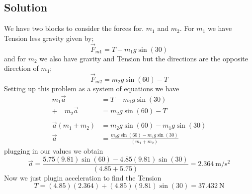 \documentclass{article}
\begin{document}
\subsection*{Solution}
We have two blocks to consider the forces for. $m_1$ and $m_2$. For $m_1$ we have Tension less gravity given by;
\[
	\vec{F}_{m1} = T - m_1 g \sin(30)
\]
and for $m_2$ we also have gravity and Tension but the directions are the opposite direction of $m_1$;
\[
	\vec{F}_{m2} = m_2 g \sin(60) - T
\]
Setting up this problem as a system of equations we have
\begin{align*}
	m_1 \vec{a} &= T - m_1 g \sin(30) \\
	+ \quad m_2 \vec{a} &= m_2 g \sin(60) - T\\
			    \\
	\vec{a}\left(m_1 + m_2\right) &= m_2 g \sin(60) - m_1 g \sin(30) \\
	\vec{a} &= \frac{m_2 g \sin(60) - m_1 g \sin(30)}{(m_1 + m_2)}
\end{align*}
plugging in our values we obtain
\[
	\vec{a} = \frac{5.75 (9.81) \sin(60) - 4.85 (9.81) \sin(30)}{(4.85 + 5.75)} =  \boxed{2.364\ \text{m}/\text{s}^2}
\]
Now we just plugin acceleration to find the Tension
\[
	T = (4.85) (2.364) + (4.85) (9.81) \sin(30) = \boxed{37.432\ \text{N}}
\]
\end{document}
